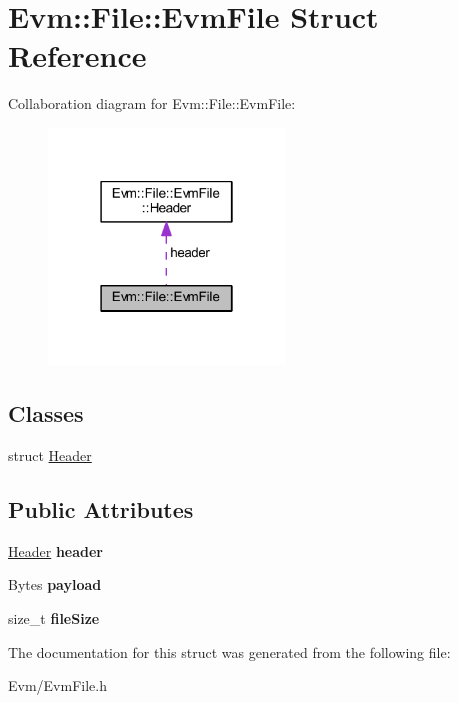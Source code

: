 \hypertarget{struct_evm_1_1_file_1_1_evm_file}{}\section{Evm\+:\+:File\+:\+:Evm\+File Struct Reference}
\label{struct_evm_1_1_file_1_1_evm_file}


Collaboration diagram for Evm\+:\+:File\+:\+:Evm\+File\+:
\nopagebreak
\begin{figure}[H]
\begin{center}
\leavevmode
\includegraphics[width=178pt]{struct_evm_1_1_file_1_1_evm_file__coll__graph}
\end{center}
\end{figure}
\subsection*{Classes}
\begin{DoxyCompactItemize}
\item 
struct \mbox{\hyperlink{struct_evm_1_1_file_1_1_evm_file_1_1_header}{Header}}
\end{DoxyCompactItemize}
\subsection*{Public Attributes}
\begin{DoxyCompactItemize}
\item 
\mbox{\label{struct_evm_1_1_file_1_1_evm_file_a72271701da24a49b5168e5c77214b918}} 
\mbox{\hyperlink{struct_evm_1_1_file_1_1_evm_file_1_1_header}{Header}} {\bfseries header}
\item 
\mbox{\label{struct_evm_1_1_file_1_1_evm_file_a7a7ce7b3e4b2a4df628afd399f1d0c8d}} 
Bytes {\bfseries payload}
\item 
\mbox{\label{struct_evm_1_1_file_1_1_evm_file_ac5104283184f117667e68b82019739d5}} 
size\+\_\+t {\bfseries file\+Size}
\end{DoxyCompactItemize}


The documentation for this struct was generated from the following file\+:\begin{DoxyCompactItemize}
\item 
Evm/Evm\+File.\+h\end{DoxyCompactItemize}

